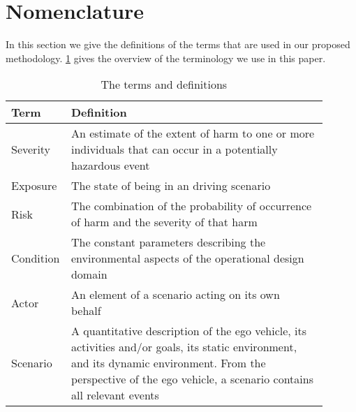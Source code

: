 \section{Nomenclature} %
\label{sec:definitions}

In this section we give the definitions of the terms that are used in our proposed methodology. 
\cref{Tab:Terms} gives the overview of the terminology we use in this paper. 



\begin{table}
	\centering
	\caption{The terms and definitions}
	\begin{tabular}{p{0.1\linewidth} p{0.8\linewidth}} \hline
		\textbf{Term} & \textbf{Definition} \\ \hline
		Severity & An estimate of the extent of harm to one or more individuals that can occur in a potentially hazardous event~\cite{ISO26262} \\
		Exposure & The state of being in an driving scenario \\
		Risk & The combination of the probability of occurrence of harm and the severity of that harm~\cite{ISO26262} \\ 
		Condition & The constant parameters describing the environmental aspects of the operational design domain \\
		Actor & An element of a scenario acting on its own behalf~\cite{ulbrich2015} \\ 
		Scenario & A quantitative description of the ego vehicle, its activities and/or goals, its static environment, and its dynamic environment. From the perspective of the ego vehicle, a scenario contains all relevant events \\ \hline
	\end{tabular}
	\label{Tab:Terms}
\end{table}